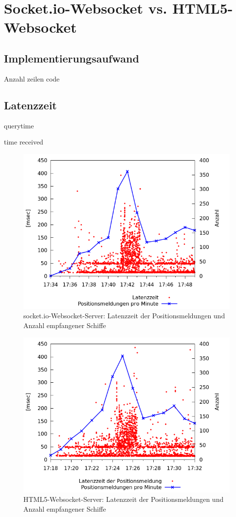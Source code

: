 \section{Socket.io-Websocket vs. HTML5-Websocket}
\subsection{Implementierungsaufwand}
Anzahl zeilen code

\subsection{Latenzzeit}
querytime

time received
\begin {figure}[H]
\begin{center}
  \includegraphics[width=4.5in]{images/latency_timeReceived_socket_io.png}
\end{center}
\caption{socket.io-Websocket-Server: Latenzzeit der Positionsmeldungen und Anzahl empfangener Schiffe}
\end {figure}

\begin {figure}[H]
\begin{center}
  \includegraphics[width=4.5in]{images/latency_timeReceived_HTML5.png}
\end{center}
\caption{HTML5-Websocket-Server: Latenzzeit der Positionsmeldungen und Anzahl empfangener Schiffe}
\end {figure}


